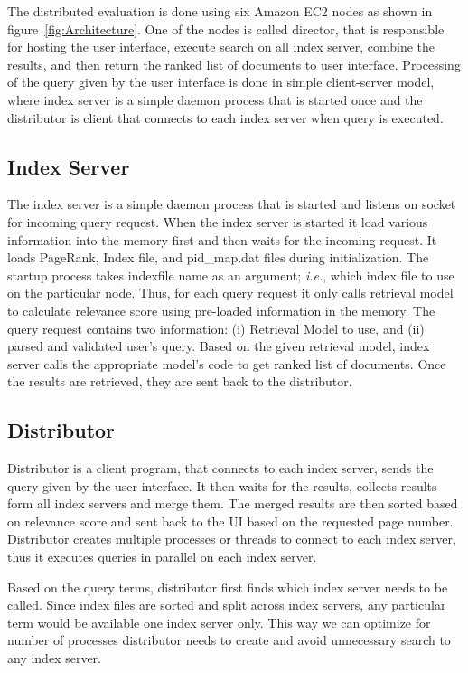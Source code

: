 \documentclass[letterpaper,11pt,twoside]{article}
\begin{document}
The distributed evaluation is done using six Amazon EC2 nodes as shown in figure~\ref{fig:Architecture}. One of the nodes is called director, that is responsible for hosting the user interface, execute search on all index server, combine the results, and then return the ranked list of documents to user interface. Processing of the query given by the user interface is done in simple client-server model, where index server is a simple daemon process that is started once and the distributor is client that connects to each index server when query is executed.

\subsection{Index Server}

The index server is a simple daemon process that is started and listens on socket for incoming query request. When the index server is started it load various information into the memory first and then waits for the incoming request. It loads PageRank, Index file, and pid\_map.dat files during initialization. The startup process takes indexfile name as an argument; \emph{i.e.}, which index file to use on the particular node. Thus, for each query request it only calls retrieval model to calculate relevance score using pre-loaded information in the memory. The query request contains two information: (i) Retrieval Model to use, and (ii) parsed and validated user's query. Based on the given retrieval model, index server calls the appropriate model's code to get ranked list of documents. Once the results are retrieved, they are sent back to the distributor. 

\subsection{Distributor}

Distributor is a client program, that connects to each index server, sends the query given by the user interface. It then waits for the results, collects results form all index servers and merge them. The merged results are then sorted based on relevance score and sent back to the UI based on the requested page number. Distributor creates multiple processes or threads to connect to each index server, thus it executes queries in parallel on each index server. 

Based on the query terms, distributor first finds which index server needs to be called. Since index files are sorted and split across index servers, any particular term would be available one index server only. This way we can optimize for number of processes distributor needs to create and avoid unnecessary search to any index server. 
\end{document}
